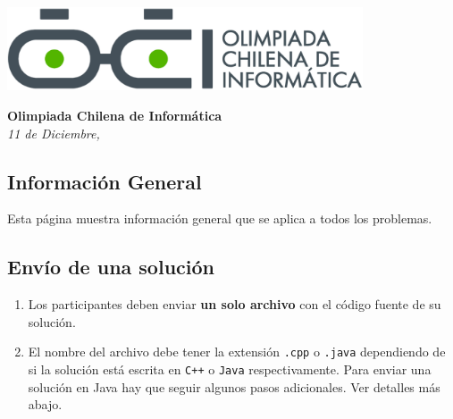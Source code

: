 \documentclass[12pt]{oci}
\begin{document}
  \begin{center}
  \includegraphics[height=70pt]{logo.eps}

  \vskip 70pt
  \Large{\bf Olimpiada Chilena de Inform\'atica\\ \the\year}
  \vskip 10pt
  \large{\phase}
  \vskip 10pt
  \normalsize{\it 11 de Diciembre, \the\year}

  \vskip 85pt

  \vskip 10pt
\end{center} %

\cleardoublepage


\subsection*{Información General}

Esta página muestra información general que se aplica a todos los problemas.

\subsection*{Envío de una solución}

\begin{enumerate}
\item Los participantes deben enviar {\bf un solo archivo} con el código fuente de su solución.
\item El nombre del archivo debe tener la extensión \verb+.cpp+ o
  \verb+.java+ dependiendo de si la solución está escrita en
  \verb|C++| o \verb|Java| respectivamente.
Para enviar una solución en Java hay que seguir algunos pasos adicionales. Ver detalles más abajo.
\end{enumerate}
\end{document}
